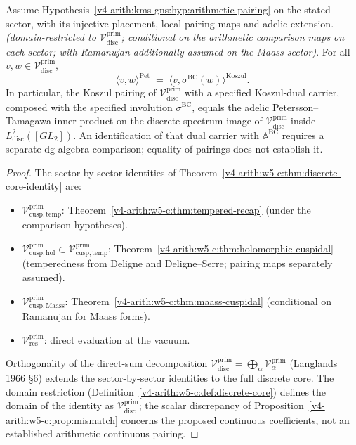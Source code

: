 \begin{theorem}
\label{v4-arith:w5-c:thm:main}
Assume Hypothesis~\ref{v4-arith:kms-gns:hyp:arithmetic-pairing}
on the stated sector, with its injective placement, local pairing maps
and adelic extension.
\emph{(domain-restricted to
\(\mathcal{V}^{\mathrm{prim}}_{\mathrm{disc}}\); conditional on the arithmetic comparison maps on each sector;
with Ramanujan additionally assumed on the Maass sector)}. For all \(v,w\in\mathcal{V}^{\mathrm{prim}}_{\mathrm{disc}}\),
\begin{equation}
\label{v4-arith:w5-c:eq:main}
\langle v,w\rangle^{\mathrm{Pet}}\;=\;\langle v,\sigma^{\mathrm{BC}}(w)\rangle^{\mathrm{Koszul}}.
\end{equation}
In particular, the Koszul pairing of
\(\mathcal{V}^{\mathrm{prim}}_{\mathrm{disc}}\) with
a specified Koszul-dual carrier,
composed with the specified involution
\(\sigma^{\mathrm{BC}}\), equals the adelic Petersson--Tamagawa
inner product on the discrete-spectrum image of
\(\mathcal{V}^{\mathrm{prim}}_{\mathrm{disc}}\) inside
\(L^{2}_{\mathrm{disc}}([GL_{2}])\).
An identification of that dual carrier with \(\mathbb A^{\mathrm{BC}}\)
requires a separate dg algebra comparison; equality of pairings
does not establish it.
\end{theorem}

\begin{proof}
The sector-by-sector identities of
Theorem~\ref{v4-arith:w5-c:thm:discrete-core-identity} are:
\begin{itemize}
\item \(\mathcal{V}^{\mathrm{prim}}_{\mathrm{cusp,temp}}\):
Theorem~\ref{v4-arith:w5-c:thm:tempered-recap} (under the comparison hypotheses).
\item \(\mathcal{V}^{\mathrm{prim}}_{\mathrm{cusp,hol}}\subset\mathcal{V}^{\mathrm{prim}}_{\mathrm{cusp,temp}}\):
Theorem~\ref{v4-arith:w5-c:thm:holomorphic-cuspidal} (temperedness from
Deligne and Deligne--Serre; pairing maps separately assumed).
\item \(\mathcal{V}^{\mathrm{prim}}_{\mathrm{cusp,Maass}}\):
Theorem~\ref{v4-arith:w5-c:thm:maass-cuspidal} (conditional on Ramanujan
for Maass forms).
\item \(\mathcal{V}^{\mathrm{prim}}_{\mathrm{res}}\): direct evaluation
at the vacuum.
\end{itemize}
Orthogonality of the direct-sum decomposition
\(\mathcal{V}^{\mathrm{prim}}_{\mathrm{disc}}=\bigoplus_{\alpha}\mathcal{V}^{\mathrm{prim}}_{\alpha}\)
(Langlands 1966 \S6) extends the sector-by-sector identities to the
full discrete core. The domain restriction
(Definition~\ref{v4-arith:w5-c:def:discrete-core}) defines the domain of the
identity as \(\mathcal{V}^{\mathrm{prim}}_{\mathrm{disc}}\); the scalar discrepancy of Proposition~\ref{v4-arith:w5-c:prop:mismatch}
concerns the proposed continuous coefficients, not an established
arithmetic continuous pairing.
\end{proof}


